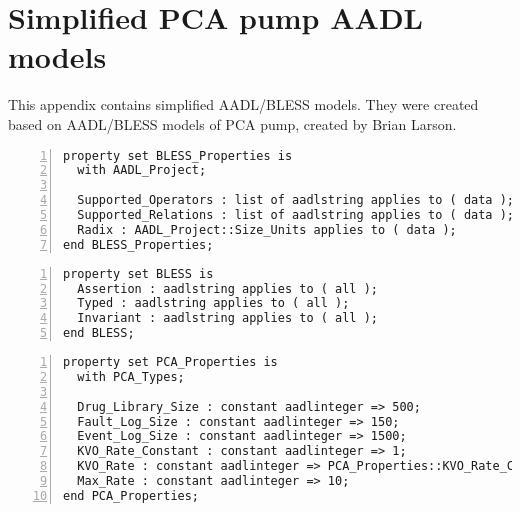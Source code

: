 
\cleardoublepage

\chapter{Simplified PCA pump AADL models}
\label{Appendix:AADL}

This appendix contains simplified AADL/BLESS models. They were created based on AADL/BLESS models of PCA pump, created by Brian Larson.
\singlespacing
\begin{lstlisting}[language=aadl, gobble=0, numbers=left, caption={\lstinline{BLESS_Properties} property set}, label={listing:aadl:bless_properties}]
property set BLESS_Properties is
  with AADL_Project;

  Supported_Operators : list of aadlstring applies to ( data );
  Supported_Relations : list of aadlstring applies to ( data );
  Radix : AADL_Project::Size_Units applies to ( data );
end BLESS_Properties;
\end{lstlisting} 
\doublespacing

\singlespacing
\begin{lstlisting}[language=aadl, gobble=0, numbers=left, caption={\lstinline{BLESS} property set}, label={listing:aadl:bless}]
property set BLESS is
  Assertion : aadlstring applies to ( all );
  Typed : aadlstring applies to ( all );
  Invariant : aadlstring applies to ( all );
end BLESS;
\end{lstlisting} 
\doublespacing

\singlespacing
\begin{lstlisting}[language=aadl, gobble=0, numbers=left, caption={\lstinline{PCA_Properties} property set}, label={listing:aadl:pca_properties}]
property set PCA_Properties is
  with PCA_Types;  
  
  Drug_Library_Size : constant aadlinteger => 500;
  Fault_Log_Size : constant aadlinteger => 150;
  Event_Log_Size : constant aadlinteger => 1500;      
  KVO_Rate_Constant : constant aadlinteger => 1;  
  KVO_Rate : constant aadlinteger => PCA_Properties::KVO_Rate_Constant;
  Max_Rate : constant aadlinteger => 10;     
end PCA_Properties;
\end{lstlisting} 
\doublespacing

